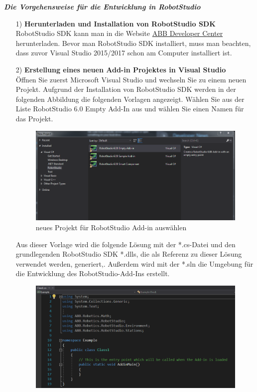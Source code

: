 \documentclass[14pt,a4paper,titlepage]{article}
\begin{document}
			\textbf{\emph{Die Vorgehensweise für die Entwicklung in RobotStudio}}
			\\
			\begin{itemize}
				\item[1)]
				\textbf{Herunterladen und Installation von RobotStudio SDK} 
				\\
				RobotStudio SDK kann man in die Website \href{http://developercenter.robotstudio.com/downloads_robotstudio}{ABB Developer Center} herunterladen. Bevor man RobotStudio SDK installiert, muss man beachten, dass zuvor Visual Studio 2015/2017 schon am Computer installiert ist. 
				
				\item[2)] 
				\textbf{Erstellung eines neuen Add-in Projektes in Visual Studio}
				\\
				Öffnen Sie zuerst Microsoft Visual Studio und wechseln Sie zu einem neuen Projekt. Aufgrund der Installation von RobotStudio SDK werden in der folgenden Abbildung die folgenden Vorlagen angezeigt.
				Wählen Sie aus der Liste RobotStudio 6.0 Empty Add-In aus und wählen Sie einen Namen für das Projekt.
					\begin{figure}[h!]
					\centering
					\includegraphics[width=0.8\linewidth]{addin.png}
					\caption{neues Projekt für RobotStudio Add-in auswählen}
					\end{figure}
				\bigbreak
				Aus dieser Vorlage wird die folgende Lösung mit der *.cs-Datei und den grundlegenden RobotStudio SDK *.dlls, die als Referenz zu dieser Lösung verwendet werden, generiert,. Außerdem wird mit der *.sln die Umgebung für die Entwicklung des RobotStudio-Add-Ins erstellt.
					\begin{figure}[h!]
					\centering
					\includegraphics[width=0.8\linewidth]{cs.png}

\end{figure}
\end{itemize}
\end{document}
